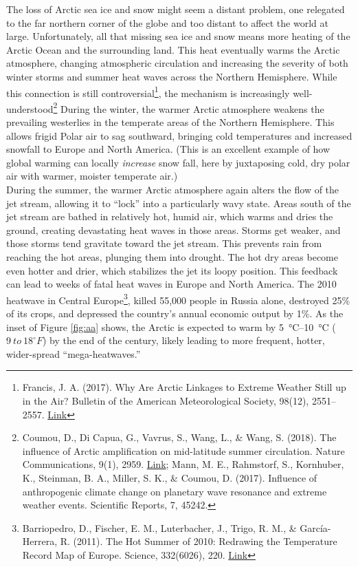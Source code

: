 \documentclass[amstex,12pt]{book}
\begin{document}
The loss of Arctic sea ice and snow might seem a distant problem, one relegated to the far northern corner of the globe and too distant to affect the world at large. Unfortunately, all that missing sea ice and snow means more heating of the Arctic Ocean and the surrounding land. This heat eventually warms the Arctic atmosphere, changing atmospheric circulation and increasing the severity of both winter storms and summer heat waves across the Northern Hemisphere. While this connection is still controversial\footnote{Francis, J. A. (2017). Why Are Arctic Linkages to Extreme Weather Still up in the Air? Bulletin of the American Meteorological Society, 98(12), 2551–2557. \href{https://doi.org/10.1175/BAMS-D-17-0006.1}{Link}}, the mechanism is increasingly well-understood\footnote{Coumou, D., Di Capua, G., Vavrus, S., Wang, L., \& Wang, S. (2018). The influence of Arctic amplification on mid-latitude summer circulation. Nature Communications, 9(1), 2959. \href{https://doi.org/10.1038/s41467-018-05256-8}{Link}; Mann, M. E., Rahmstorf, S., Kornhuber, K., Steinman, B. A., Miller, S. K., \& Coumou, D. (2017). Influence of anthropogenic climate change on planetary wave resonance and extreme weather events. Scientific Reports, 7, 45242.} During the winter, the warmer Arctic atmosphere weakens the prevailing westerlies in the temperate areas of the Northern Hemisphere. This allows frigid Polar air to sag southward, bringing cold temperatures and increased snowfall to Europe and North America. (This is an excellent example of how global warming can locally \emph{increase} snow fall, here by juxtaposing cold, dry polar air with warmer, moister temperate air.)\\
During the summer, the warmer Arctic atmosphere again alters the flow of the jet stream, allowing it to ``lock'' into a particularly wavy state. Areas south of the jet stream are bathed in relatively hot, humid air, which warms and dries the ground, creating devastating heat waves in those areas. Storms get weaker, and those storms tend gravitate toward the jet stream. This prevents rain from reaching the hot areas, plunging them into drought. The hot dry areas become even hotter and drier, which stabilizes the jet its loopy position. This feedback can lead to weeks of fatal heat waves in Europe and North America. The 2010 heatwave in Central Europe\footnote{Barriopedro, D., Fischer, E. M., Luterbacher, J., Trigo, R. M., \& García-Herrera, R. (2011). The Hot Summer of 2010: Redrawing the Temperature Record Map of Europe. Science, 332(6026), 220. \href{https://doi.org/10.1126/science.1201224}{Link}}, killed 55,000 people in Russia alone, destroyed 25\% of its crops, and depressed the country's annual economic output by 1\%. As the inset of Figure \ref{fig:aa} shows, the Arctic is expected to warm by \SIrange{5}{10}{\celsius} ($9\ to \ 18^{\circ}F$) by the end of the century, likely leading to more frequent, hotter, wider-spread ``mega-heatwaves.''    
\end{document}
